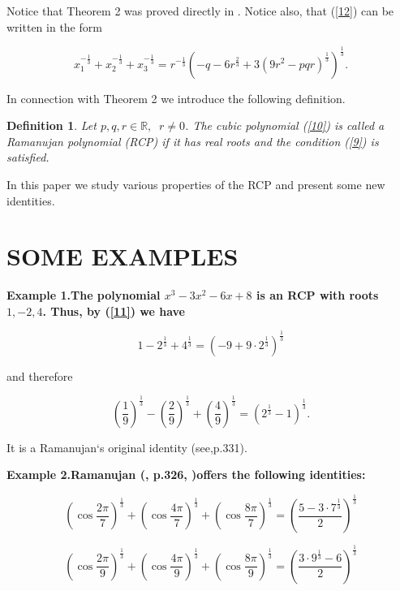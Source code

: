 \documentclass[12pt,oneside,english]{amsart}
\newtheorem{definition}{Definition}
\begin{document}
Notice that Theorem 2 was proved directly in \cite{6}. Notice also,
that (\ref{12}) can be written in the form

\begin{equation}\label{13}
x_1^{-\frac 1 3}+x_2^{-\frac 1 3}+x_3^{-\frac 1 3}=r^{-\frac 1
3}(-q-6r^{\frac 2 3}+3(9r^2-pqr)^{\frac 1 3})^{\frac 1 3}.
\end{equation}

In connection with Theorem 2 we introduce the following definition.
\newpage

\begin{definition}  Let $p, q, r\in \mathbb{R},\;\;r\neq 0$. The
cubic polynomial (\ref{10}) is called a Ramanujan polynomial (RCP)
if it has real roots and the condition (\ref{9}) is satisfied.
\end{definition}

     In  this paper we study various properties of the RCP and
present some new identities.



\section{SOME EXAMPLES}\label{s2}

\bfseries Example 1.\mdseries The polynomial $x^3-3x^2-6x+8$ is an
RCP with roots $1, -2, 4$. Thus, by (\ref{11}) we have

$$
1-2^{\frac 1 3}+4^{\frac 1 3}=(-9+9\cdot 2^{\frac 1 3})^{\frac 1 3}
$$

and therefore

\begin{equation}\label{14}
\left(\frac 1 9\right)^{\frac 1 3}-\left(\frac 2 9\right)^{\frac 1
3}+\left(\frac 4 9\right)^{\frac 1 3}=(2^{\frac 1 3}-1)^{\frac 1 3}.
\end{equation}

     It is a Ramanujan`s original identity (see\cite{5},p.331).

\bfseries Example 2.\mdseries Ramanujan (\cite{4}, p.326,
\cite{1})offers the following identities:

\begin{equation}\label{15}
\left(\cos\frac{2\pi}{7}\right)^{\frac 1 3}+\left(\cos\frac
{4\pi}{7}\right)^{\frac 1 3}+\left(\cos\frac{8\pi}{7}\right)^{\frac
1 3}=\left(\frac{5-3\cdot 7^{\frac 1 3}}{2} \right)^{\frac 1 3}
\end{equation}

\begin{equation}\label{16}
\left(\cos\frac{2\pi}{9}\right)^{\frac 1 3}+\left(\cos\frac
{4\pi}{9}\right)^{\frac 1 3}+\left(\cos\frac{8\pi}{9}\right)^{\frac
1 3}=\left(\frac{3\cdot 9^{\frac 1 3}-6}{2} \right)^{\frac 1 3}
\end{equation}
\end{document}
